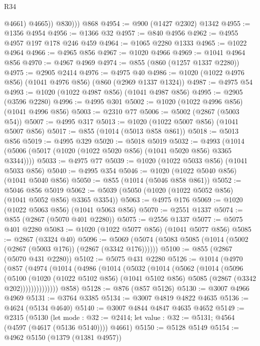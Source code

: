 \begin{lexlean}{R34}
\begin{coremodule}
              @4661)
            @4665))
          @830)))
    @868
@4954 := @900 (@1427 @2302) @1342
@4955 := @1356 @4954
@4956 := @1366 @32
@4957 := @840 @4956
@4962 := @4955 @4957 @197 @178 @246 @459
@4964 := @1065 @2280 @1333
@4965 := @1022 @4964
@4966 := @4965 @856
@4967 := @1020 @4966
@4969 := @1041 @4964 @856
@4970 := @4967 @4969
@4974 := @855 (@860 (@1257 @1337 @2280))
@4975 := @2905 @2414
@4976 := @4975 @40
@4986 := @1020 (@1022 @4976 @856) (@1041 @4976 @856) (@860 (@2969 @1337 @1324))
@4987 := @4975 @54
@4993 := @1020 (@1022 @4987 @856) (@1041 @4987 @856)
@4995 := @2905 (@3596 @2280)
@4996 := @4995 @301
@5002 := @1020 (@1022 @4996 @856) (@1041 @4996 @856)
@5003 := @2310 @77
@5006 := @5002 (@2867 (@5003 @54))
@5007 := @4995 @317
@5013 := @1020 (@1022 @5007 @856) (@1041 @5007 @856)
@5017 := @855 (@1014 (@5013 @858 @861))
@5018 := @5013 @856
@5019 := @4995 @329
@5020 := @5018 @5019
@5032 := @4993 (@1014 (@5006 (@5017 (@1020 (@1022 @5020 @856) (@1041 @5020 @856) @3365 @3344))))
@5033 := @4975 @77
@5039 := @1020 (@1022 @5033 @856) (@1041 @5033 @856)
@5040 := @4995 @354
@5046 := @1020 (@1022 @5040 @856) (@1041 @5040 @856)
@5050 := @855 (@1014 (@5046 @858 @861))
@5052 := @5046 @856 @5019
@5062 := @5039 (@5050 (@1020 (@1022 @5052 @856) (@1041 @5052 @856) @3365 @3354))
@5063 := @4975 @176
@5069 := @1020 (@1022 @5063 @856) (@1041 @5063 @856)
@5070 := @2551 @1337
@5074 := @855 (@2867 (@5070 @401 @2280))
@5075 := @2556 @1337
@5077 := @5075 @401 @2280
@5083 := @1020 (@1022 @5077 @856) (@1041 @5077 @856)
@5085 := @2867 (@3324 @40)
@5096 := @5069 (@5074 (@5083 @5085 (@1014 (@5002 (@2867 (@5003 @176)) (@2867 (@3342 @176))))))
@5100 := @855 (@2867 (@5070 @431 @2280))
@5102 := @5075 @431 @2280
@5126 := @1014
    (@4970
      (@857
        (@4974
          (@1014
            (@4986
              (@1014
                (@5032
                  (@1014
                    (@5062
                      (@1014
                        (@5096
                          (@5100
                            (@1020
                              (@1022 @5102 @856)
                              (@1041 @5102 @856)
                              @5085
                              (@2867 (@3342 @202))))))))))))))
      @858)
@5128 := @876 (@857 @5126)
@5130 := @3007 @4966 @4969
@5131 := @3764 @3385
@5134 := @3007 @4819 @4822 @4635
@5136 := @4624 (@5134 @4640)
@5140 := @3007 @4844 @4847 @4635 @4652
@5149 := @2315
    (@5130
      (let mode : @32 := @2414; let value : @32 := @5131; @4564 (@4597 (@4617 (@5136 @5140))))
      @4661)
@5150 := @5128 @5149
@5154 := @4962 @5150 (@1379 (@1381 @4957))

\end{coremodule}
\end{lexlean}
